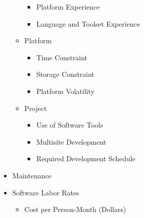\begin{itemize}
\begin{itemize}
\begin{itemize}
			\item Platform Experience
			\item Language and Toolset Experience
		\end{itemize}
		\item Platform
		\begin{itemize}
			\item Time Constraint
			\item Storage Constraint
			\item Platform Volatility
		\end{itemize}
		\item Project
		\begin{itemize}
			\item Use of Software Tools
			\item Multisite Development
			\item Required Development Schedule
		\end{itemize}
	\end{itemize}
	\item Maintenance
	\item Software Labor Rates
	\begin{itemize}
		\item Cost per Person-Month (Dollars)
	\end{itemize}	
\end{itemize}


%